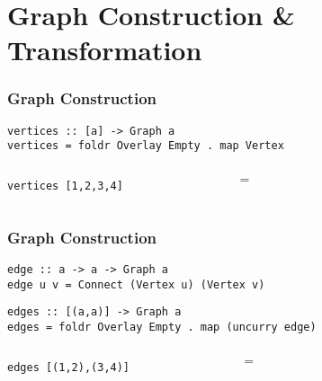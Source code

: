 \documentclass{beamer}
\newcommand{\hs}{\texttt}
\begin{document}
\section{Graph Construction \& Transformation}
\begin{frame}[fragile]
  \frametitle{Graph Construction}
  \onslide<+->
  \begin{verbatim}
vertices :: [a] -> Graph a
vertices = foldr Overlay Empty . map Vertex   
  \end{verbatim}
  \onslide<+->
  \vspace{5mm}
  \begin{columns}
    \begin{column}{.3\textwidth}
      \hs{vertices [1,2,3,4]}
    \end{column}
    \begin{column}{.05\textwidth}
      {\LARGE $=$}
    \end{column}
    \begin{column}{.4\textwidth}
    \end{column}
  \end{columns}
\end{frame}

\begin{frame}[fragile]
  \frametitle{Graph Construction}
  \onslide<+->
  \begin{verbatim}
edge :: a -> a -> Graph a
edge u v = Connect (Vertex u) (Vertex v)
  \end{verbatim}
  \onslide<+->
  \begin{verbatim}
edges :: [(a,a)] -> Graph a
edges = foldr Overlay Empty . map (uncurry edge)
  \end{verbatim}
  \onslide<+->
  \vspace{5mm}
  \begin{columns}
    \begin{column}{.3\textwidth}
      \hs{edges [(1,2),(3,4)]}
    \end{column}
    \begin{column}{.05\textwidth}
      {\LARGE $=$}
    \end{column}
    \begin{column}{.4\textwidth}
    \end{column}
  \end{columns}
\end{frame}
\end{document}
